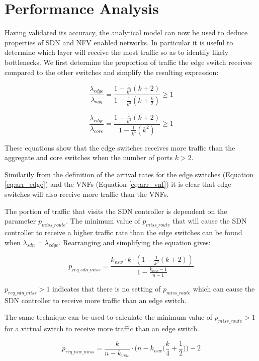 \section{Performance Analysis}
\label{sec:performance}
Having validated its accuracy, the analytical model can now be used to deduce properties of SDN and NFV enabled networks. In particular it is useful to determine which layer will receive the most traffic so as to identify likely bottlenecks. We first determine the proportion of traffic the edge switch receives compared to the other switches and simplify the resulting expression:

\begin{equation}
\frac{\lambda_{edge}}{\lambda_{agg}} = \frac{1 - \frac{1}{k^3}(k + 2)}{1 - \frac{1}{k^3}(k + \frac{k}{2})} \geq 1
\end{equation}

\begin{equation}
\frac{\lambda_{edge}}{\lambda_{core}} = \frac{1 - \frac{1}{k^3}(k + 2)}{1 - \frac{1}{k^3}(k^2)} \geq 1
\end{equation}

These equations show that the edge switches receives more traffic than the aggregate and core switches when the number of ports $k > 2$.

Similarily from the definition of the arrival rates for the edge switches (Equation \ref{eq:arr_edge}) and the VNFs (Equation \ref{eq:arr_vnf}) it is clear that edge switches will also receive more traffic than the VNFs.

The portion of traffic that visits the SDN controller is dependent on the parameter $p_{miss\_route}$. The minimum value of $p_{miss\_route}$ that will cause the SDN controller to receive a higher traffic rate than the edge switches can be found when $\lambda_{sdn} = \lambda_{edge}$. Rearranging and simplifying the equation gives:

\begin{equation}
p_{req\_sdn\_miss} = \frac{k_{vsw} \cdot k \cdot (1 - \frac{1}{k^3}(k + 2))}{1 - \frac{k_{vsw} - 1}{n - 1}}
\end{equation}

$p_{req\_sdn\_miss} > 1$ indicates that there is no setting of $p_{miss\_route}$ which can cause the SDN controller to receive more traffic than an edge switch.

The same technique can be used to calculate the minimum value of $p_{miss\_route} > 1$ for a virtual switch to receive more traffic than an edge switch. 

\begin{equation}
p_{req\_vsw\_miss} = \frac{k}{n-k_{vsw}}\cdot\bigg(n-k_{vsw}\bigg(\frac{k}{4} + \frac{1}{2}\bigg)\bigg) - 2
\end{equation}
